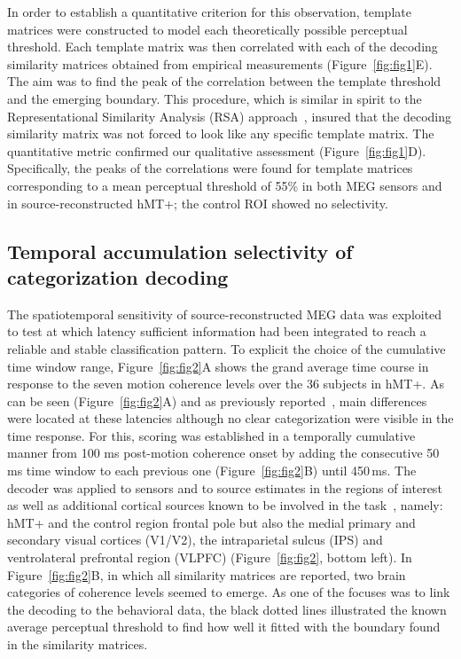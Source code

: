 In order to establish a quantitative criterion for this observation, template matrices were constructed to model each theoretically possible perceptual threshold. Each template matrix was then correlated with each of the decoding similarity matrices obtained from empirical measurements (Figure~\ref{fig:fig1}E). The aim was to find the peak of the correlation between the template threshold and the emerging boundary. This procedure, which is similar in spirit to the Representational Similarity Analysis (RSA) approach~\cite{Kriegeskorte-etal:08,9cichy2014resolving}, insured that the decoding similarity matrix was not forced to look like any specific template matrix. The quantitative metric confirmed our qualitative assessment (Figure~\ref{fig:fig1}D). Specifically, the peaks of the correlations were found for template matrices corresponding to a mean perceptual threshold of 55\% in both MEG sensors and in source-reconstructed hMT+; the control ROI showed no selectivity.

\subsection*{Temporal accumulation selectivity of categorization decoding}
The spatiotemporal sensitivity of source-reconstructed MEG data was exploited to test at which latency sufficient information had been integrated to reach a reliable and stable classification pattern. To explicit the choice of the cumulative time window range, Figure~\ref{fig:fig2}A shows the grand average time course in response to the seven motion coherence levels over the 36 subjects in hMT+. As can be seen (Figure~\ref{fig:fig2}A) and as previously reported~\cite{23zilber2014supramodal}, main differences were located at these latencies although no clear categorization were visible in the time response. For this, scoring was established in a temporally cumulative manner from 100 ms post-motion coherence onset by adding the consecutive 50 ms time window to each previous one (Figure~\ref{fig:fig2}B) until 450\,ms. The decoder was applied to sensors and to source estimates in the regions of interest as well as additional cortical sources known to be involved in the task~\cite{23zilber2014supramodal}, namely: hMT+ and the control region frontal pole but also the medial primary and secondary visual cortices (V1/V2), the intraparietal sulcus (IPS) and ventrolateral prefrontal region (VLPFC) (Figure~\ref{fig:fig2}, bottom left). In Figure~\ref{fig:fig2}B, in which all similarity matrices are reported, two brain categories of coherence levels seemed to emerge. As one of the focuses was to link the decoding to the behavioral data, the black dotted lines illustrated the known average perceptual threshold  to find how well it fitted with the boundary found in the similarity matrices.

